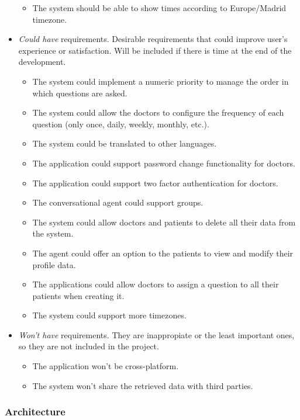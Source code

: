 \documentclass[12pt,english]{article}
\begin{document}
\begin{itemize}
\begin{itemize}
      \item The system should be able to show times according to Europe/Madrid timezone.
    \end{itemize}
  \item \emph{Could have} requirements. Desirable requirements that could improve user's experience or satisfaction. Will be included if there is time at the end of the development.
    \begin{itemize}
      \item The system could implement a numeric priority to manage the order in which questions are asked.
      \item The system could allow the doctors to configure the frequency of each question (only once, daily, weekly, monthly, etc.).
      \item The system could be translated to other languages.
      \item The application could support password change functionality for doctors.
      \item The application could support two factor authentication for doctors.
      \item The conversational agent could support groups.
      \item The system could allow doctors and patients to delete all their data from the system.
      \item The agent could offer an option to the patients to view and modify their profile data.
      \item The applications could allow doctors to assign a question to all their patients when creating it.
      \item The system could support more timezones.
    \end{itemize}
  \item \emph{Won't have} requirements. They are inappropiate or the least important ones, so they are not included in the project.
    \begin{itemize}
      \item The application won't be cross-platform.
      \item The system won't share the retrieved data with third parties.
    \end{itemize}
\end{itemize}
\newpage
\subsubsection{Architecture}
\end{document}
